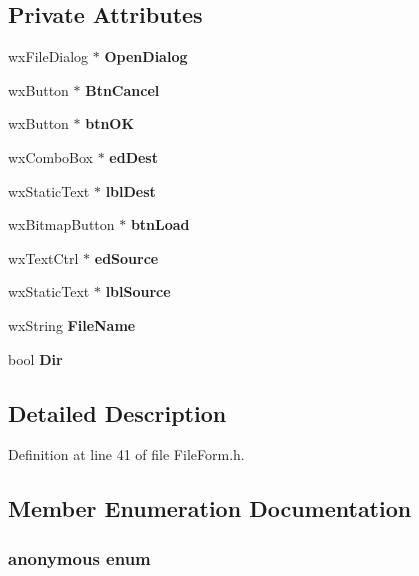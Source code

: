 \subsection*{Private Attributes}
\begin{CompactItemize}
\item 
wx\-File\-Dialog $\ast$ {\bf Open\-Dialog}
\item 
wx\-Button $\ast$ {\bf Btn\-Cancel}
\item 
wx\-Button $\ast$ {\bf btn\-OK}
\item 
wx\-Combo\-Box $\ast$ {\bf ed\-Dest}
\item 
wx\-Static\-Text $\ast$ {\bf lbl\-Dest}
\item 
wx\-Bitmap\-Button $\ast$ {\bf btn\-Load}
\item 
wx\-Text\-Ctrl $\ast$ {\bf ed\-Source}
\item 
wx\-Static\-Text $\ast$ {\bf lbl\-Source}
\item 
wx\-String {\bf File\-Name}
\item 
bool {\bf Dir}
\end{CompactItemize}


\subsection{Detailed Description}




Definition at line 41 of file File\-Form.h.

\subsection{Member Enumeration Documentation}
\subsubsection{\setlength{\rightskip}{0pt plus 5cm}anonymous enum\hspace{0.3cm}{\tt  [private]}}\label{class_file_form_b9c4f07e59d9066826681d0af87d3d07}


